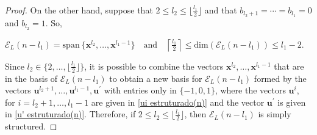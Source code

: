 \documentclass[10pt,a4paper]{amsart}
\begin{document}
\begin{proof}
On the other hand, suppose that $2\leq l_2 \leq \lfloor \frac{l_1}{2} \rfloor$ and that $b_{l_2+1}=\cdots=b_{l_1}=0$ and $b_{l_2}=1$. So,
\begin{center}
$\mathcal{E}_L(n-l_1)=\mathrm{span} \ \{ \mathbf{x}^{l_2}, \ldots, \mathbf{x}^{l_1-1} \} \quad  \textrm{and} \quad \left\lceil \frac{l_1}{2} \right\rceil \leq \mathrm{dim}(\mathcal{E}_{L}(n-l_1)) \leq l_1-2.$
\end{center} 
Since $l_2 \in \{2,\ldots, \lfloor \frac{l_1}{2} \rfloor\}$, it is possible to combine the vectors $\mathbf{x}^{l_2}, \ldots, \mathbf{x}^{l_1-1}$ that are in the basis of $\mathcal{E}_L(n-l_1)$ to obtain a new basis for $\mathcal{E}_L(n-l_1)$ formed by the vectors $\mathbf{u}^{l_2+1}, \ldots, \mathbf{u}^{l_1-1},\mathbf{u}^{\prime}$ with entries only in $\{-1,0,1\}$, where the vectors $\mathbf{u}^{i}$, for $i=l_2+1, \ldots, l_1-1$ are given in \eqref{ui estruturado(n)} and the vector $\mathbf{u}^{\prime}$ is given in \eqref{u' estruturado(n)}. Therefore, if $2\leq l_2 \leq \lfloor \frac{l_1}{2} \rfloor$, then $\mathcal{E}_L(n-l_1)$ is simply structured.
\end{proof} 
\end{document}
